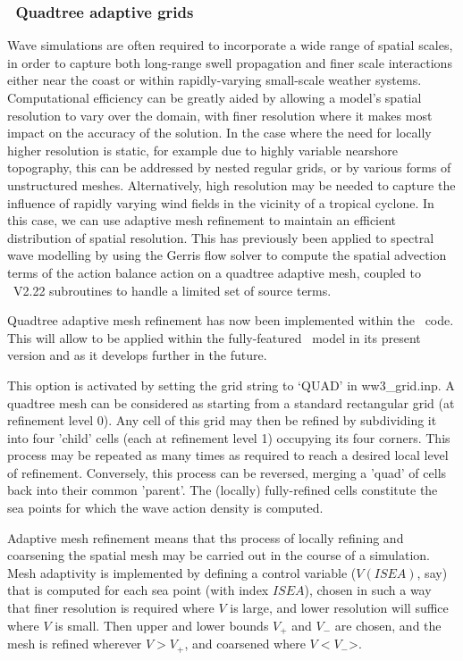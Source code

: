 \vssub
\subsubsection{~Quadtree adaptive grids} \label{sub:num_space_qa}

\noindent 
Wave simulations are often required to incorporate a wide range of spatial 
scales, in order to capture both long-range swell propagation and finer scale 
interactions either near the coast or within rapidly-varying small-scale 
weather systems.
Computational efficiency can be greatly aided by allowing a model's spatial 
resolution to vary over the domain, with finer resolution where it makes most 
impact on the accuracy of the solution.
In the case where the need for locally higher resolution is static,
for example due to highly variable nearshore topography, this can be addressed 
by nested regular grids, or by various forms of unstructured meshes.
Alternatively, high resolution may be needed to capture the influence of
rapidly varying wind fields in the vicinity of a tropical cyclone.
In this case, we can use adaptive mesh refinement to maintain an efficient 
distribution of spatial resolution.
This has previously been applied to spectral wave modelling 
\citep{art:PGRT10xx} 
by using the Gerris flow solver \citep{art:PopinetXX} to compute the spatial 
advection terms of the action balance action on a quadtree adaptive mesh, coupled to \ws\ V2.22 subroutines to handle a limited set of source terms.

Quadtree adaptive mesh refinement has now been implemented within the \ws\ code. This will allow to be applied within the fully-featured \ws\ model 
in its present version and as it develops further in the future.

This option is activated by setting the grid string to `{\code QUAD}' in 
{\file ww3\_grid.inp}. A quadtree mesh can be considered as starting from
a standard rectangular grid (at refinement level 0). Any cell of this grid may then be refined by subdividing it into four 'child' cells (each at refinement 
level 1) occupying its four corners. This process may be repeated as many 
times as required to reach a desired local level of refinement. Conversely, 
this process can be reversed, merging a 'quad' of cells back into their 
common 'parent'. The (locally) fully-refined cells constitute the sea points 
for which the wave action density is computed.

Adaptive mesh refinement means that ths process of locally refining and 
coarsening the spatial mesh may be carried out in the course of a simulation. 
Mesh adaptivity is implemented by defining a control variable ($V(ISEA)$, say) that is computed for each sea point (with index $ISEA$), chosen in such a 
way that finer resolution is required where $V$ is large, and lower resolution 
will suffice where $V$ is small. Then upper and lower bounds $V_+$ and $V_-$ 
are chosen, and the mesh is refined wherever $V>V_+$, and coarsened where
$V<V_-$>.

